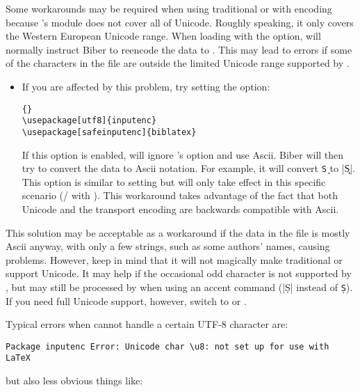 \documentclass{ltxdockit}[2011/03/25]
\newcommand*{\biber}{Biber\xspace}
\begin{document}
Some workarounds may be required when using traditional \tex or \pdftex with \utf encoding because 's  module does not cover all of Unicode. Roughly speaking, it only covers the Western European Unicode range. When loading  with the  option,  will normally instruct \biber to reencode the  data to \utf. This may lead to  errors if some of the characters in the  file are outside the limited Unicode range supported by .

\begin{itemize}

\item If you are affected by this problem, try setting the  option:

\begin{lstlisting}[style=latex]{}
\usepackage[utf8]{inputenc}
\usepackage[safeinputenc]{biblatex}
\end{lstlisting}
%
If this option is enabled,  will ignore 's  option and use Ascii. \biber will then try to convert the  data to Ascii notation. For example, it will convert \texttt{\k{S}} to |\k{S}|. This option is similar to setting  but will only take effect in this specific scenario (\slash {} with \utf). This workaround takes advantage of the fact that both Unicode and the \utf transport encoding are backwards compatible with Ascii.

\end{itemize}

This solution may be acceptable as a workaround if the data in the  file is mostly Ascii anyway, with only a few strings, such as some authors' names, causing problems. However, keep in mind that it will not magically make traditional \tex or \pdftex support Unicode. It may help if the occasional odd character is not supported by , but may still be processed by \tex when using an accent command (\eg |\d{S}| instead of \texttt{\d{S}}). If you need full Unicode support, however, switch to \xetex or \luatex.

Typical errors when  cannot handle a certain UTF-8 character are:

\begin{verbatim}
Package inputenc Error: Unicode char \u8: not set up for use with LaTeX
\end{verbatim}
%
but also less obvious things like:
\end{document}

